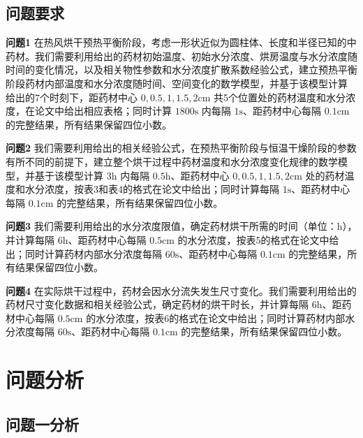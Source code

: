 \documentclass[withoutpreface,bwprint]{cumcm_thesis}
\begin{document}

\subsection{问题要求}



\textbf{问题1}  
在热风烘干预热平衡阶段，考虑一形状近似为圆柱体、长度和半径已知的中药材。我们需要利用给出的药材初始温度、初始水分浓度、烘房温度与水分浓度随时间的变化情况，以及相关物性参数和水分浓度扩散系数经验公式，建立预热平衡阶段药材内部温度和水分浓度随时间、空间变化的数学模型，并基于该模型计算 给出的7个时刻下，距药材中心 \(0,0.5,1,1.5,2\mathrm{cm}\) 共5个位置处的药材温度和水分浓度，在论文中给出相应表格；同时计算 \(1800\mathrm{s}\) 内每隔 \(1\mathrm{s}\)、距药材中心每隔 \(0.1\mathrm{cm}\) 的完整结果，所有结果保留四位小数。

\textbf{问题2 }  
我们需要利用给出的相关经验公式，在预热平衡阶段与恒温干燥阶段的参数有所不同的前提下，建立整个烘干过程中药材温度和水分浓度变化规律的数学模型，并基于该模型计算 \(3\mathrm{h}\) 内每隔 \(0.5\mathrm{h}\)、距药材中心 \(0,0.5,1,1.5,2\mathrm{cm}\) 处的药材温度和水分浓度，按表3和表4的格式在论文中给出；同时计算每隔 \(1\mathrm{s}\)、距药材中心每隔 \(0.1\mathrm{cm}\) 的完整结果，所有结果保留四位小数。

\textbf{问题3}  
我们需要利用给出的水分浓度限值，确定药材烘干所需的时间（单位：\(\mathrm{h}\)），并计算每隔 \(6\mathrm{h}\)、距药材中心每隔 \(0.5\mathrm{cm}\) 的水分浓度，按表5的格式在论文中给出；同时计算药材内部水分浓度每隔 \(60\mathrm{s}\)、距药材中心每隔 \(0.1\mathrm{cm}\) 的完整结果，所有结果保留四位小数。

\textbf{问题4}  
在实际烘干过程中，药材会因水分流失发生尺寸变化。我们需要利用给出的药材尺寸变化数据和相关经验公式，确定药材的烘干时长，并计算每隔 \(6\mathrm{h}\)、距药材中心每隔 \(0.5\mathrm{cm}\) 的水分浓度，按表6的格式在论文中给出；同时计算药材内部水分浓度每隔 \(60\mathrm{s}\)、距药材中心每隔 \(0.1\mathrm{cm}\) 的完整结果，所有结果保留四位小数。






\section{问题分析}
\subsection{问题一分析}
\end{document}
